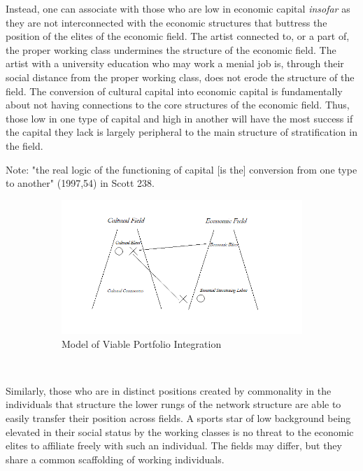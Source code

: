 \documentclass[12pt]{article}
\begin{document}
Instead, one can associate with those who are low in economic capital \textit{insofar} as they are not interconnected with the economic structures that buttress the position of the elites of the economic field. The artist connected to, or a part of, the proper working class undermines the structure of the economic field. The artist with a university education who may work a menial job is, through their social distance from the proper working class, does not erode the structure of the field. The conversion of cultural capital into economic capital is fundamentally about not having connections to the core structures of the economic field. Thus, those low in one type of capital and high in another will have the most success if the capital they lack is largely peripheral to the main structure of stratification in the field.

Note: "the real logic of the functioning of capital [is the] conversion from one type to another" (1997,54) in Scott 238.

\begin{figure}
    \captionsetup[subfigure]{font=footnotesize,labelfont=footnotesize}
    \centering
     \begin{subfigure}[b]{1.0\textwidth}
        \includegraphics[width=1.0\textwidth]{Plots/PortfolioIntegration.png}
            \caption{Model of Viable Portfolio Integration}
            \label{fig:medici}
    \end{subfigure} \\
    \caption{}
    \label{fig:integration}
\end{figure}

Similarly, those who are in distinct positions created by commonality in the individuals that structure the lower rungs of the network structure are able to easily transfer their position across fields. A sports star of low background being elevated in their social status by the working classes is no threat to the economic elites to affiliate freely with such an individual. The fields may differ, but they share a common scaffolding of working individuals.
\end{document}
